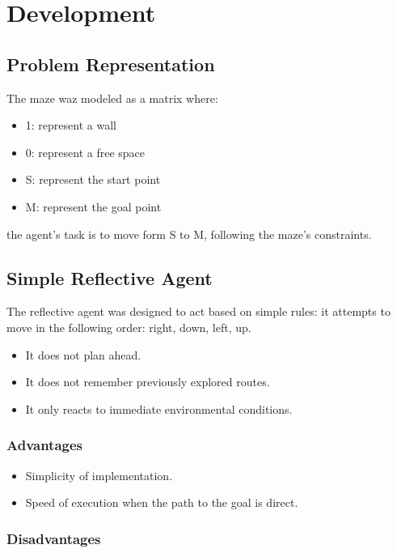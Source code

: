 \documentclass[letterpaper,12pt,oneside]{article}
\begin{document}
\section{Development}

\subsection{Problem Representation}

The maze waz modeled as a matrix where:

\begin{itemize}
    \item 1: represent a wall
    \item 0: represent a free space
    \item S: represent the start point
    \item M: represent the goal point
\end{itemize}

the agent's task is to move form S to M, following the maze's constraints.

\subsection{Simple Reflective Agent}

The reflective agent was designed to act based on simple rules: it attempts to move in the following order: right, down, left, up.

\begin{itemize}
    \item It does not plan ahead.
    \item It does not remember previously explored routes.
    \item It only reacts to immediate environmental conditions.
\end{itemize}

\subsubsection{Advantages}

\begin{itemize}
    \item Simplicity of implementation.
    \item Speed of execution when the path to the goal is direct.
\end{itemize}

\subsubsection{Disadvantages}
\end{document}
